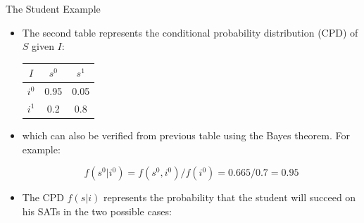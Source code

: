 \documentclass[handout]{beamer}
\begin{document}
\begin{frame}{The Student Example}
\scriptsize{
\begin{itemize}

\item The second table represents the conditional probability distribution (CPD) of $S$ given $I$:

\begin{table}
\centering
  \begin{tabular}{c||cc} \hline
$I$ & $s^0$ & $s^1$  \\ \hline
$i^0$ & 0.95 & 0.05 \\
$i^1$ & 0.2 & 0.8 \\

\end{tabular} 
\end{table}

\item which can also be verified from previous table using the Bayes theorem. For example:

\begin{displaymath}
f(s^{0}|i^0)=f(s^{0},i^0)/f(i^0)= 0.665/0.7=0.95
\end{displaymath}

\item The CPD $f(s| i)$ represents the probability that the student will succeed on his SATs in the two possible cases:


\end{itemize}



} 

\end{frame}
\end{document}
